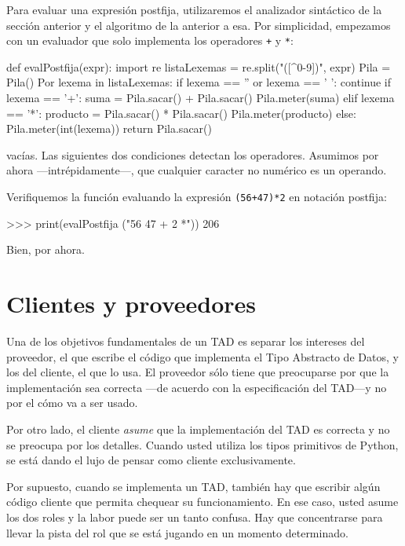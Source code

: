 Para evaluar una expresión postfija, utilizaremos el analizador sintáctico
de la sección anterior y el algoritmo de la anterior a esa. Por simplicidad,
empezamos con un evaluador que solo implementa los operadores \texttt{+}
y \texttt{{*}}:


\begin{pythoncode}
def evalPostfija(expr):
  import re
  listaLexemas = re.split("([^0-9])", expr)
  Pila = Pila()
  Por lexema in listaLexemas:
    if  lexema == '' or lexema == ' ':
      continue
    if  lexema == '+':
      suma = Pila.sacar() + Pila.sacar()
      Pila.meter(suma)
    elif lexema == '*':
      producto = Pila.sacar() * Pila.sacar()
      Pila.meter(producto)
    else:
      Pila.meter(int(lexema))
  return Pila.sacar()
\end{pythoncode}
vacías. Las siguientes dos condiciones detectan los operadores. Asumimos
por ahora —intrépidamente—, que cualquier caracter no numérico es
un operando.

Verifiquemos la función evaluando la expresión \texttt{(56+47){*}2}
en notación postfija:

\beforeverb 
\begin{pyconcode}
>>> print(evalPostfija ("56 47 + 2 *"))
206
\end{pyconcode}
\afterverb Bien, por ahora.

\section{Clientes y proveedores}

 

Una de los objetivos fundamentales de un TAD es separar los intereses
del proveedor, el que escribe el código que implementa el Tipo Abstracto
de Datos, y los del cliente, el que lo usa. El proveedor sólo tiene
que preocuparse por que la implementación sea correcta —de acuerdo
con la especificación del TAD—y no por el cómo va a ser usado.

Por otro lado, el cliente {\em asume} que la implementación del
TAD es correcta y no se preocupa por los detalles. Cuando usted utiliza
los tipos primitivos de Python, se está dando el lujo de pensar como
cliente exclusivamente.

Por supuesto, cuando se implementa un TAD, también hay que escribir
algún código cliente que permita chequear su funcionamiento. En ese
caso, usted asume los dos roles y la labor puede ser un tanto confusa.
Hay que concentrarse para llevar la pista del rol que se está jugando
en un momento determinado.


